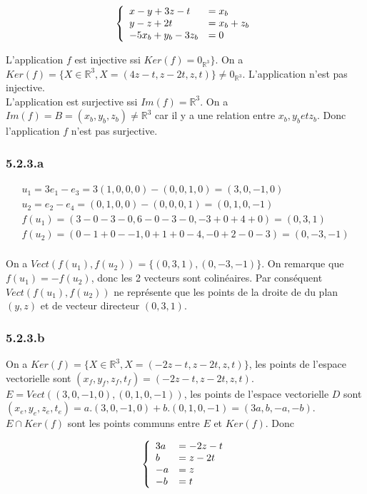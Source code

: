 \documentclass[]{book}
\theoremstyle{definition}
\newcommand{\bb}[1]{\mathbb{#1}}
\newcommand{\R}{\bb{R}}
\begin{document}
$$
\left\{ 
\begin{array}{l l}
x -y +3z -t & = x_b \\
y -z + 2t & = x_b+z_b \\
-5x_b +y_b -3 z_b & =  0 \\
\end{array}
\right. 
$$


L'application $f$ est injective ssi $Ker(f) = 0_{\R^3}\}$. On a $Ker(f)= \{X \in \R^3, X=(4z-t,z-2t, z, t)\} \neq 0_{\R^3}$. L'application n'est pas injective.\\

L'application est surjective ssi $Im(f) = \R^3$. On a $Im(f) = B= (x_b,y_b,z_b) \neq \R^3$ car il y a une relation entre $x_b,y_b et z_b$. Donc l'application $f$ n'est pas surjective.

\subsubsection*{5.2.3.a}	
$$
\begin{array}{l}
u_1 = 3e_1-e_3 = 3(1,0,0,0)-(0,0,1,0) = (3,0,-1,0) \\
u_2 = e_2 -e_4 = (0,1,0,0) - (0,0,0,1) = (0,1,0,-1) \\
f(u_1) = (3 - 0 -3 - 0, 6 - 0 -3 -0, -3 + 0 +4 +0)= (0, 3 ,1) \\
f(u_2) = (0-1+0--1, 0 +1 + 0 -4, -0 + 2 -0 -3) = (0,-3,-1) \\
\end{array}
$$

On a $Vect(f(u_1), f(u_2)) = \{(0,3,1),(0,-3,-1)\}$. On remarque que $f(u_1)=-f(u_2)$, donc les 2 vecteurs sont colin\'eaires. Par cons\'equent $Vect(f(u_1), f(u_2))$ ne repr\'esente que les points de la droite de du plan $(y,z)$ et de vecteur directeur $(0,3,1)$.

\subsubsection*{5.2.3.b}
On a $Ker(f)=\{X \in \R^3, X=(-2z-t,z-2t, z, t)\}$,  les points de l'espace vectorielle sont $(x_f,y_f,z_f,t_f) = (-2z-t,z-2t, z, t)$.\\
$E=Vect((3,0,-1,0), (0,1,0,-1))$, les points de l'espace vectorielle $D$ sont $(x_e,y_e,z_e,t_e) = a.(3,0,-1,0) + b.(0,1,0,-1) = (3a,b,-a,-b)$.\\

$E \cap Ker(f)$ sont les points communs entre $E$ et $Ker(f)$. Donc

$$
\left\{ 
\begin{array}{l l}
3a & = -2z - t \\
b & = z-2t \\
-a & = z \\
-b & = t \\
\end{array}
\right. 
$$
\end{document}
